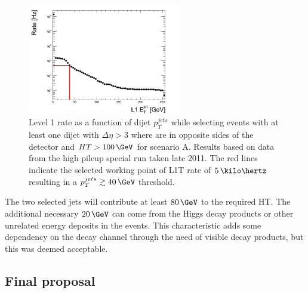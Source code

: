 \begin{figure}[!htb]
\centering
\includegraphics[width=0.60\textwidth]{Chapter07/ParkedDataTriggerDevelopment/Images/PU28_5e33_RateFBDijetDEtaDPhi00HT100.png}
\caption[Level 1 rate as a function of dijet $p_T^{jets}$ while selecting events with at least one dijet with $\Delta\eta>3$ where are in opposite sides of the detector and $HT>100\,\GeV$ for scenario A.]
{Level 1 rate as a function of dijet $p_T^{jets}$ while selecting events with at least one dijet with $\Delta\eta>3$ where are in opposite sides of the detector and $HT>100\,\GeV$ for scenario A. Results based on data from the high pileup special run taken late 2011. The red lines indicate the selected working point of \gls{L1T} rate of $5\,\kilo\hertz$ resulting in a $p_T^{jets} \gtrsim 40\,\GeV$ threshold.}
\label{FIGURE:ParkedDataAnalysis_ParkedTriggerDevelopment_PU28_5e33_RateFBDijetDEtaDPhi00HT100}
\end{figure}

The two selected jets will contribute at least $80\,\GeV$ to the required \gls{HT}. The additional necessary $20\,\GeV$ can come from the Higgs decay products or other unrelated energy deposits in the events. This characteristic adds some dependency on the decay channel through the need of visible decay products, but this was deemed acceptable.

\subsection{Final proposal}



